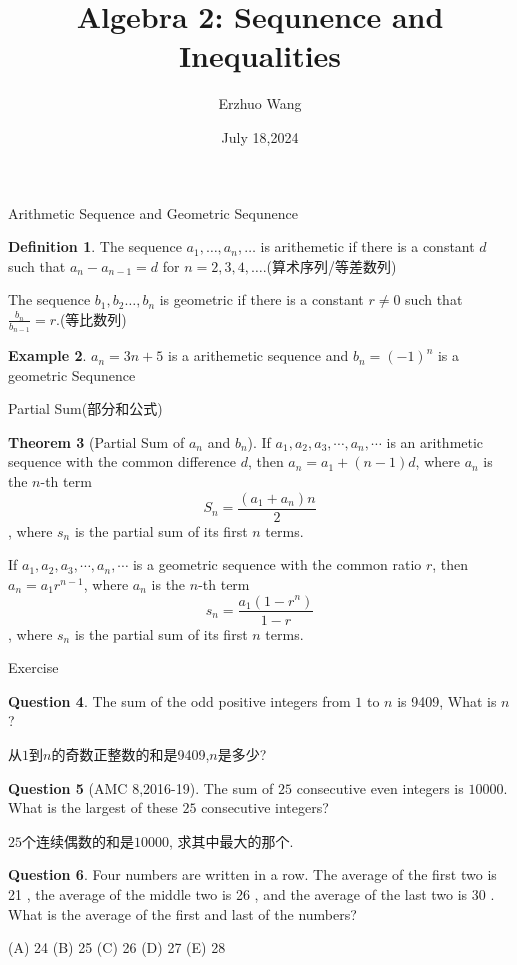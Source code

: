 \documentclass{beamer}
\title{Algebra 2: Sequnence and Inequalities}
\institute{Youth STEM Academy}
\author{Erzhuo Wang}
\date{July 18,2024}
\theoremstyle{definition}
\newtheorem{defn}{Definition}[section]
\newtheorem{theo}[defn]{Theorem}
\newtheorem{exam}[defn]{Example}
\newtheorem{ques}[defn]{Question}
\begin{document}
\begin{frame}
    \titlepage
\end{frame}
\begin{frame}{Arithmetic Sequence and Geometric Sequnence}
    \begin{defn}
        The sequence $a_1,\dots,a_n,\dots$ is arithemetic if there is a constant $d$ such that $a_n-a_{n-1}=d$ for
        $n=2,3,4,\dots$.(算术序列/等差数列)

        The sequence $b_1,b_2\dots,b_n$ is geometric if there is a constant $r\neq 0$ such that $\frac{b_n}{b_{n-1}}=r$.(等比数列)
    \end{defn}
    \begin{exam}
        $a_n=3n+5$ is a arithemetic sequence and $b_n=(-1)^n$ is a geometric Sequnence
    \end{exam}
\end{frame}
\begin{frame}{Partial Sum(部分和公式)}
    \begin{theo}[Partial Sum of $a_n$ and $b_n$]
        If $a_1, a_2, a_3, \cdots, a_n, \cdots$ is an arithmetic sequence with the common difference $d$, then
        $a_n=a_1+(n-1) d$, where $a_n$ is the $n$-th term
        $$S_n=\frac{\left(a_1+a_n\right) n}{2}$$,
        where $s_n$ is the partial sum of its first $n$ terms.

        If $a_1, a_2, a_3, \cdots, a_n, \cdots$ is a geometric sequence with the common ratio $r$, then
        $a_n=a_1 r^{n-1}$, where $a_n$ is the $n$-th term
        $$s_n=\frac{a_1\left(1-r^n\right)}{1-r}$$,
        where $s_n$ is the partial sum of its first $n$ terms.

    \end{theo}
\end{frame}
\begin{frame}{Exercise}
    \begin{ques}
        The sum of the odd positive integers from $1$ to $n$ is 9409, What is $n$?

        从$1$到$n$的奇数正整数的和是9409,$n$是多少?
    \end{ques}
    \begin{ques}[AMC 8,2016-19]
        The sum of $25$ consecutive even integers is $10000$. What is the largest of these
        $25$ consecutive integers?

        $25$个连续偶数的和是$10000$, 求其中最大的那个.
    \end{ques}
    \begin{ques}
        Four numbers are written in a row. The average of the first two is 21 , the average of the middle two is 26 , and the average of the last two is 30 . What is the average of the first and last of the numbers?
        
        (A) 24 (B) 25 (C) 26 (D) 27 (E) 28
    \end{ques}
\end{frame}
\end{document}

